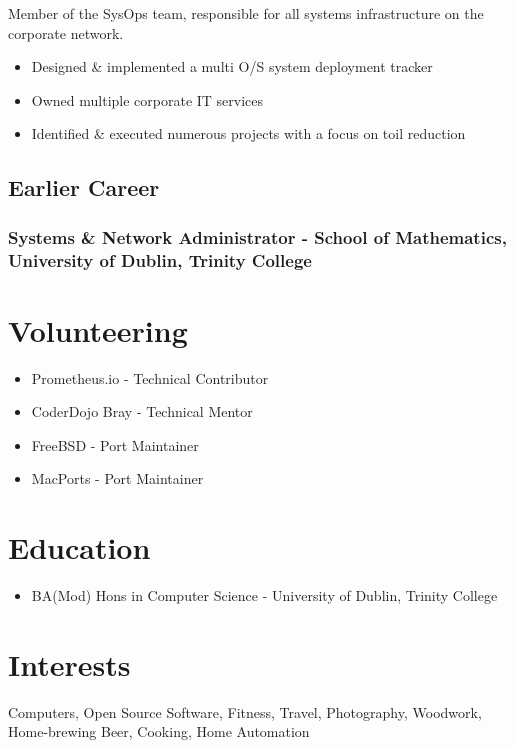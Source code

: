 \documentclass[a4paper, 10pt] {article}
\begin{document}
Member of the SysOps team, responsible for all systems infrastructure on
the corporate network.

\begin{itemize}[noitemsep]
	\item Designed \& implemented a multi O/S system deployment tracker
	\item Owned multiple corporate IT services
	\item Identified \& executed numerous projects with a focus on toil reduction
\end{itemize}

\subsection*{Earlier Career}

\subsubsection*{Systems \& Network Administrator - School of Mathematics, University of Dublin, Trinity College}

\hrulefill

\section*{Volunteering}

\begin{itemize}[noitemsep]
  \item Prometheus.io - Technical Contributor
  \item CoderDojo Bray - Technical Mentor
  \item FreeBSD - Port Maintainer
  \item MacPorts - Port Maintainer
\end{itemize}

\hrulefill

\section*{Education}

\begin{itemize}
  \item BA(Mod) Hons in Computer Science - University of Dublin, Trinity College
\end{itemize}

\hrulefill

\section*{Interests}

Computers, Open Source Software, Fitness, Travel, Photography, Woodwork,
Home-brewing Beer, Cooking, Home Automation
\end{document}
